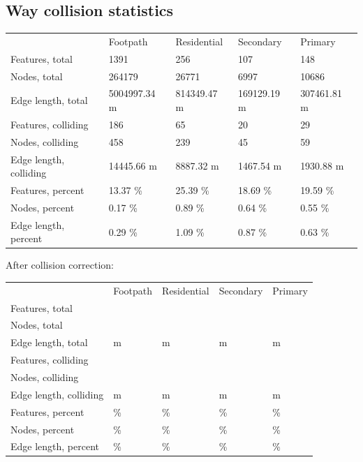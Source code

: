 \documentclass[a4paper]{article}
\begin{document}
\subsection{Way collision statistics}

\begin{table}[H]
\begin{tabular}{lllll}
                            & Footpath      & Residential  & Secondary   & Primary     \\
    Features, total         & 1391          & 256          & 107         & 148         \\
    Nodes, total            & 264179        & 26771        & 6997        & 10686       \\
    Edge length, total      & 5004997.34 m  & 814349.47 m  & 169129.19 m & 307461.81 m \\
    Features, colliding     & 186           & 65           & 20          & 29          \\
    Nodes, colliding        & 458           & 239          & 45          & 59          \\
    Edge length, colliding  & 14445.66 m    & 8887.32 m    & 1467.54 m   & 1930.88 m   \\
    Features, percent       & 13.37 \%      & 25.39 \%     & 18.69 \%    & 19.59 \%    \\
    Nodes, percent          & 0.17 \%       & 0.89 \%      & 0.64 \%     & 0.55 \%     \\
    Edge length, percent    & 0.29 \%       & 1.09 \%      & 0.87 \%     & 0.63 \%

\end{tabular}
\end{table}

After collision correction:

\begin{table}[H]
\begin{tabular}{lllll}
                            & Footpath      & Residential  & Secondary   & Primary     \\
    Features, total         & & & & \\
    Nodes, total            & & & & \\
    Edge length, total      & m & m & m & m \\
    Features, colliding     & & & & \\
    Nodes, colliding        & & & & \\
    Edge length, colliding  & m & m & m & m \\
    Features, percent       & \% & \% & \% & \% \\
    Nodes, percent          & \% & \% & \% & \% \\
    Edge length, percent    & \% & \% & \% & \%

\end{tabular}
\end{table}
\end{document}
